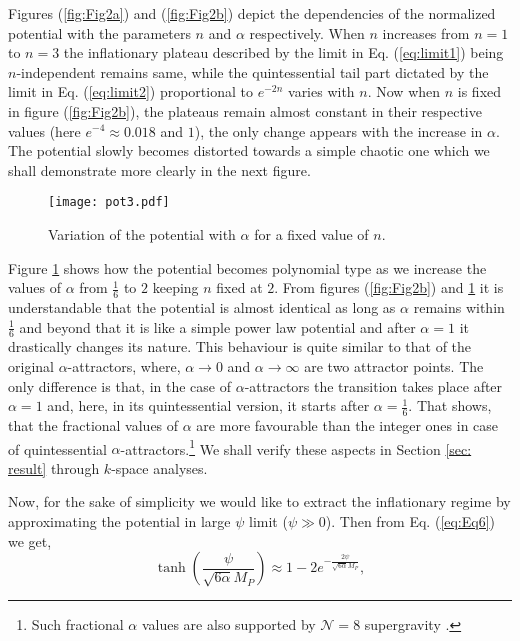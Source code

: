 \documentclass[a4paper,11pt]{article}
\begin{document}
Figures (\ref{fig:Fig2a}) and (\ref{fig:Fig2b}) depict the dependencies of the normalized potential with the parameters $n$ and $\alpha$ respectively. When $n$ increases from $n=1$ to $n=3$ the inflationary plateau described by the limit in Eq. (\ref{eq:limit1}) being $n$-independent remains same, while the quintessential tail part dictated by the limit in Eq. (\ref{eq:limit2}) proportional to $e^{-2n}$ varies with $n$.  Now when $n$ is fixed in figure (\ref{fig:Fig2b}), the plateaus remain almost constant in their respective values (here $e^{-4}\approx0.018$ and $1$), the only change appears with the increase in $\alpha$. The potential slowly becomes distorted towards a simple chaotic one which we shall demonstrate more clearly in the next figure.
\begin{figure}[H]
	\centering
	\texttt{[image: pot3.pdf]}
	\caption{Variation of the potential with $\alpha$ for a fixed value of $n$.}
	\label{fig:Fig3}
\end{figure}
Figure \ref{fig:Fig3} shows how the potential becomes polynomial type as we increase the values of $\alpha$ from $\frac{1}{6}$ to $2$ keeping $n$ fixed at $2$. From figures (\ref{fig:Fig2b}) and \ref{fig:Fig3} it is understandable that the potential is almost identical as long as $\alpha$ remains within $\frac{1}{6}$ and beyond that it is like a simple power law potential and after $\alpha =1$ it drastically changes its nature. This behaviour is quite similar to that of the original $\alpha$-attractors, where, $\alpha\rightarrow 0$ and $\alpha\rightarrow \infty$ are two attractor points. The only difference is that, in the case of $\alpha$-attractors the transition takes place after $\alpha =1$ and, here, in its quintessential version, it starts after $\alpha =\frac{1}{6}$. That shows, that the fractional values of $\alpha$ are more favourable than the integer ones in case of quintessential $\alpha$-attractors.\footnote{Such fractional $\alpha$ values are also supported by $\mathcal{N}=8$ supergravity \cite{Kallosh:2017ced}.} We shall verify these aspects in Section \ref{sec: result} through $k$-space analyses.\par 
Now, for the sake of simplicity we would like to extract the inflationary regime by approximating the potential in large $\psi$ limit ($\psi\gg 0$). Then from Eq. (\ref{eq:Eq6}) we get,
\begin{equation}
    \tanh{\left(\frac{\psi}{\sqrt{6\alpha}M_P}\right)}\approx 1-2e^{-\frac{2\psi}{\sqrt{6\alpha}M_P}},
\end{equation}
\end{document}
